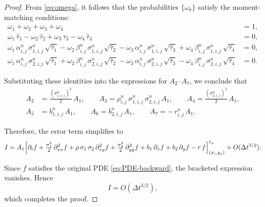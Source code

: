 \documentclass[10pt,a4paper]{amsart}
\begin{document}
\begin{proof}
		From \eqref{eq:omega}, it follows that the probabilities $\{\omega_k\}$ satisfy the moment-matching conditions:
		\[
		\begin{aligned}
			\omega_1 + \omega_2 + \omega_3 + \omega_4 &= 1,\\
			\omega_1\,\hat{\tau}_1 - \omega_2\,\hat{\tau}_2
			+ \omega_3\,\hat{\tau}_3 - \omega_4\,\hat{\tau}_4 &= 0,\\
			\omega_1\,\alpha_{i,j}^n\,\sigma_{1,i,j}^n\,\sqrt{\hat\tau_1}
			- \omega_2\,\beta_{i,j}^n\,\sigma_{1,i,j}^n\,\sqrt{\hat\tau_2}
			- \omega_3\,\alpha_{i,j}^n\,\sigma_{1,i,j}^n\,\sqrt{\hat\tau_3}
			+ \omega_4\,\beta_{i,j}^n\,\sigma_{1,i,j}^n\,\sqrt{\hat\tau_4} &= 0,\\
			\omega_1\,\alpha_{i,j}^n\,\sigma_{2,i,j}^n\,\sqrt{\hat\tau_1}
			+ \omega_2\,\beta_{i,j}^n\,\sigma_{2,i,j}^n\,\sqrt{\hat\tau_2}
			- \omega_3\,\alpha_{i,j}^n\,\sigma_{2,i,j}^n\,\sqrt{\hat\tau_3}
			- \omega_4\,\beta_{i,j}^n\,\sigma_{2,i,j}^n\,\sqrt{\hat\tau_4} &= 0.
		\end{aligned}
		\]
		
		Substituting these identities into the expressions for $A_2$--$A_7$, we conclude that
		\[
		\begin{aligned}
			A_2 &= \tfrac{(\sigma_{1,i,j}^n)^2}{2}\,A_1,\qquad 
			A_3 = \rho_{i,j}^n\,\sigma_{1,i,j}^n\,\sigma_{2,i,j}^n\,A_1,\qquad
			A_4 = \tfrac{(\sigma_{2,i,j}^n)^2}{2}\,A_1,\\
			A_5 &= b_{1,i,j}^n\,A_1,\qquad 
			A_6 = b_{2,i,j}^n\,A_1,\qquad 
			A_7 = -\,r_{i,j}^n\,A_1.
		\end{aligned}
		\]
		
		Therefore, the error term simplifies to
		\[
		I = A_1\Bigl[\partial_t f + \tfrac{\sigma_1^2}{2}\,\partial_{xx}^2 f
		+ \rho\,\sigma_1\,\sigma_2\,\partial_{xy}^2 f 
		+ \tfrac{\sigma_2^2}{2}\,\partial_{yy}^2 f
		+ b_1\,\partial_x f + b_2\,\partial_y f - r\,f\Bigr]_{(x_i,y_j)}^{t_n}
		+ O(\Delta t^{3/2}).
		\]
		
		Since $f$ satisfies the original PDE \eqref{eq:PDE-backward}, the bracketed expression vanishes. Hence
		\[
		I = O(\Delta t^{3/2}),
		\]
		which completes the proof.
	\end{proof}
\end{document}
